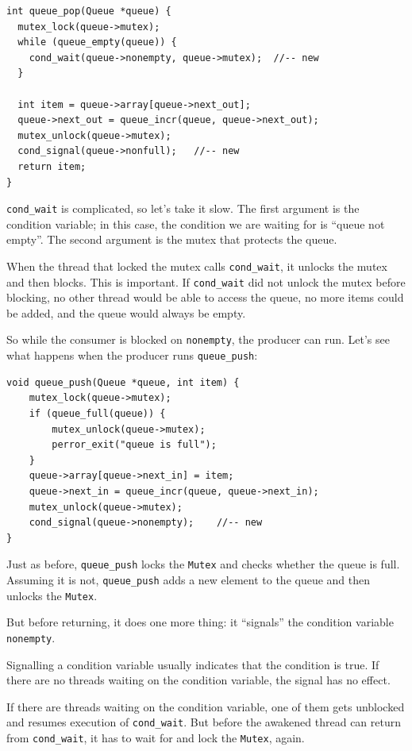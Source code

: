 \documentclass[12pt]{book}
\begin{document}
{\begin{verbatim}
int queue_pop(Queue *queue) {
  mutex_lock(queue->mutex);
  while (queue_empty(queue)) {
    cond_wait(queue->nonempty, queue->mutex);  //-- new
  }
  
  int item = queue->array[queue->next_out];
  queue->next_out = queue_incr(queue, queue->next_out);
  mutex_unlock(queue->mutex);
  cond_signal(queue->nonfull);   //-- new
  return item;
}
\end{verbatim}

\verb"cond_wait" is complicated, so let's take it slow.  
The first argument is the condition variable; in this case,
the condition we are waiting for is ``queue not empty''.  The second
argument is the mutex that protects the queue.

When the thread that locked the mutex calls \verb"cond_wait", it
unlocks the mutex and then blocks.  This is important.  If
\verb"cond_wait" did not unlock the mutex before blocking, no
other thread would be able to access the queue, no more items
could be added, and the queue would always be empty.

So while the consumer is blocked on {\tt nonempty}, the producer can
run.  Let's see what happens when the producer runs \verb"queue_push":

\begin{verbatim}
void queue_push(Queue *queue, int item) {
    mutex_lock(queue->mutex);
    if (queue_full(queue)) {
        mutex_unlock(queue->mutex);
        perror_exit("queue is full");
    }
    queue->array[queue->next_in] = item;
    queue->next_in = queue_incr(queue, queue->next_in);
    mutex_unlock(queue->mutex);
    cond_signal(queue->nonempty);    //-- new
}
\end{verbatim}

Just as before, \verb"queue_push" locks the {\tt Mutex} and checks
whether the queue is full.  Assuming it is not, \verb"queue_push" adds
a new element to the queue and then unlocks the {\tt Mutex}.

But before returning, it does one more thing: it ``signals'' the
condition variable {\tt nonempty}.

Signalling a condition variable usually indicates that the condition is
true.  If there are no threads waiting
on the condition variable, the signal has no effect.

If there are threads waiting on the condition variable, one of them
gets unblocked and resumes execution of \verb"cond_wait".  But before
the awakened thread can return from \verb"cond_wait", it has
to wait for and lock the {\tt Mutex}, again.

}
\end{document}
